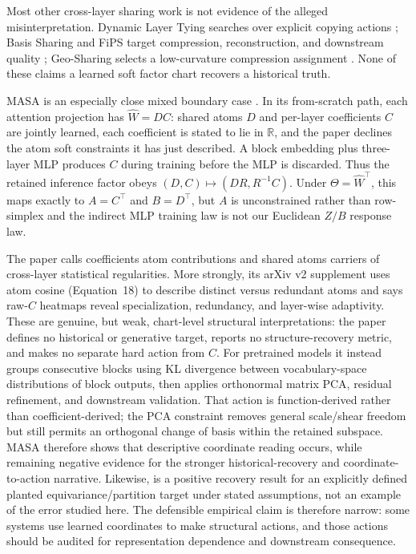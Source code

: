 Most other cross-layer sharing work is not evidence of the alleged
misinterpretation.  Dynamic Layer Tying searches over explicit copying
actions \citep{davidhay2024dynamic}; Basis Sharing and FiPS target
compression, reconstruction, and downstream quality
\citep{wang2025basis,uyuk2026fips}; Geo-Sharing selects a low-curvature
compression assignment \citep{zhang2025geosharing}.  None of these claims a
learned soft factor chart recovers a historical truth.

MASA is an especially close mixed boundary case
\citep[AAAI pp.~29262--29263; arXiv v2, supplementary p.~14]{zhussip2026share}.
In its from-scratch path, each attention projection has
$\widehat W=DC$: shared atoms $D$ and per-layer coefficients $C$ are jointly
learned, each coefficient is stated to lie in $\mathbb R$, and the paper
declines the atom soft constraints it has just described.  A block embedding
plus three-layer MLP produces $C$ during training before the MLP is discarded.
Thus the retained inference factor obeys
$(D,C)\mapsto(DR,R^{-1}C)$.  Under
$\Theta=\widehat W^\top$, this maps exactly to $A=C^\top$ and $B=D^\top$, but
$A$ is unconstrained rather than row-simplex and the indirect MLP training law
is not our Euclidean $Z/B$ response law.

The paper calls coefficients atom contributions and shared atoms carriers of
cross-layer statistical regularities.  More strongly, its arXiv v2 supplement
uses atom cosine (Equation~18) to describe distinct versus redundant atoms and
says raw-$C$ heatmaps reveal specialization, redundancy, and layer-wise
adaptivity.  These are genuine, but weak, chart-level structural
interpretations: the paper defines no historical or generative target, reports
no structure-recovery metric, and makes no separate hard action from $C$.
For pretrained models it instead groups consecutive blocks using KL divergence
between vocabulary-space distributions of block outputs, then applies
orthonormal matrix PCA, residual refinement, and downstream validation.  That
action is function-derived rather than coefficient-derived; the PCA constraint
removes general scale/shear freedom but still permits an orthogonal change of
basis within the retained subspace.  MASA therefore shows that descriptive
coordinate reading occurs, while remaining negative evidence for the stronger
historical-recovery and coordinate-to-action narrative.  Likewise,
\citet{yeh2022equivariance} is a positive recovery result for an explicitly
defined planted equivariance/partition target under stated assumptions, not
an example of the error studied here.  The defensible empirical claim is
therefore narrow: some systems use learned coordinates to make structural
actions, and those actions should be audited for representation dependence and
downstream consequence.

